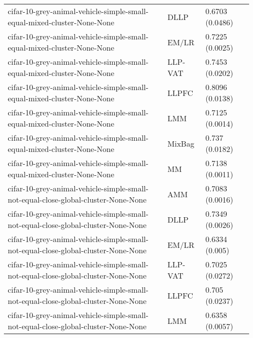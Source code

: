 \begin{longtable}{lll}
                                      cifar-10-grey-animal-vehicle-simple-small-equal-mixed-cluster-None-None &      DLLP &                           0.6703 (0.0486) \\
                                      cifar-10-grey-animal-vehicle-simple-small-equal-mixed-cluster-None-None &     EM/LR &                           0.7225 (0.0025) \\
                                      cifar-10-grey-animal-vehicle-simple-small-equal-mixed-cluster-None-None &   LLP-VAT &                           0.7453 (0.0202) \\
                                      cifar-10-grey-animal-vehicle-simple-small-equal-mixed-cluster-None-None &     LLPFC &                           0.8096 (0.0138) \\
                                      cifar-10-grey-animal-vehicle-simple-small-equal-mixed-cluster-None-None &       LMM &                           0.7125 (0.0014) \\
                                      cifar-10-grey-animal-vehicle-simple-small-equal-mixed-cluster-None-None &    MixBag &                            0.737 (0.0182) \\
                                      cifar-10-grey-animal-vehicle-simple-small-equal-mixed-cluster-None-None &        MM &                           0.7138 (0.0011) \\
                           cifar-10-grey-animal-vehicle-simple-small-not-equal-close-global-cluster-None-None &       AMM &                           0.7083 (0.0016) \\
                           cifar-10-grey-animal-vehicle-simple-small-not-equal-close-global-cluster-None-None &      DLLP &                           0.7349 (0.0026) \\
                           cifar-10-grey-animal-vehicle-simple-small-not-equal-close-global-cluster-None-None &     EM/LR &                            0.6334 (0.005) \\
                           cifar-10-grey-animal-vehicle-simple-small-not-equal-close-global-cluster-None-None &   LLP-VAT &                           0.7025 (0.0272) \\
                           cifar-10-grey-animal-vehicle-simple-small-not-equal-close-global-cluster-None-None &     LLPFC &                            0.705 (0.0237) \\
                           cifar-10-grey-animal-vehicle-simple-small-not-equal-close-global-cluster-None-None &       LMM &                           0.6358 (0.0057) \\

\end{longtable}
